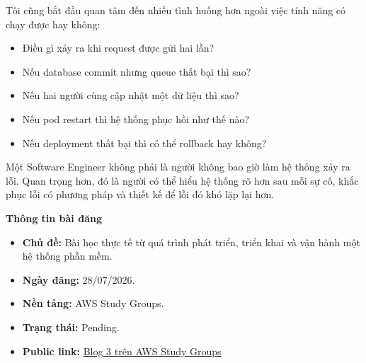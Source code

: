Tôi cũng bắt đầu quan tâm đến nhiều tình huống hơn ngoài việc tính năng
có chạy được hay không:

\begin{itemize}
\tightlist
\item
  Điều gì xảy ra khi request được gửi hai lần?
\item
  Nếu database commit nhưng queue thất bại thì sao?
\item
  Nếu hai người cùng cập nhật một dữ liệu thì sao?
\item
  Nếu pod restart thì hệ thống phục hồi như thế nào?
\item
  Nếu deployment thất bại thì có thể rollback hay không?
\end{itemize}

Một Software Engineer không phải là người không bao giờ làm hệ thống xảy
ra lỗi. Quan trọng hơn, đó là người có thể hiểu hệ thống rõ hơn sau mỗi
sự cố, khắc phục lỗi có phương pháp và thiết kế để lỗi đó khó lặp lại
hơn.

\vspace{0.5em}\noindent\textbf{Thông tin bài đăng}\par

\begin{itemize}
\tightlist
\item
  \textbf{Chủ đề:} Bài học thực tế từ quá trình phát triển, triển khai
  và vận hành một hệ thống phần mềm.
\item
  \textbf{Ngày đăng:} 28/07/2026.
\item
  \textbf{Nền tảng:} AWS Study Groups.
\item
  \textbf{Trạng thái:} Pending.
\item
  \textbf{Public link:}
  \href{https://www.facebook.com/groups/awsstudygroupfcj/permalink/2227122848052675/\#}{Blog
  3 trên AWS Study Groups}
\end{itemize}
